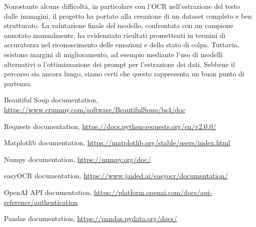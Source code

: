 \documentclass[11pt]{article}
\begin{document}
Nonostante alcune difficoltà, in particolare con l’OCR nell’estrazione del testo dalle immagini, il progetto ha portato alla creazione di un dataset completo e ben strutturato. La valutazione finale del modello, confrontata con un campione annotato manualmente, ha evidenziato risultati promettenti in termini di accuratezza nel riconoscimento delle emozioni e dello stato di colpa. Tuttavia, esistono margini di miglioramento, ad esempio mediante l’uso di modelli alternativi o l’ottimizzazione dei prompt per l’estrazione dei dati. Sebbene il percorso sia ancora lungo, siamo certi che questo rappresenta un buon punto di partenza.





\begin{thebibliography}{}

Beautiful Soup documentation, \url{https://www.crummy.com/software/BeautifulSoup/bs4/doc}

Requests documentation, \url{https://docs.python-requests.org/en/v2.0.0/}

Matplotlib documentation, \url{https://matplotlib.org/stable/users/index.html}

Numpy documentation, 
\url{https://numpy.org/doc/}

easyOCR documentation, \url{https://www.jaided.ai/easyocr/documentation/}

OpenAI API documentation, \url{https://platform.openai.com/docs/api-reference/authentication}

Pandas documentation, \url{https://pandas.pydata.org/docs/}

\end{thebibliography}
\end{document}
